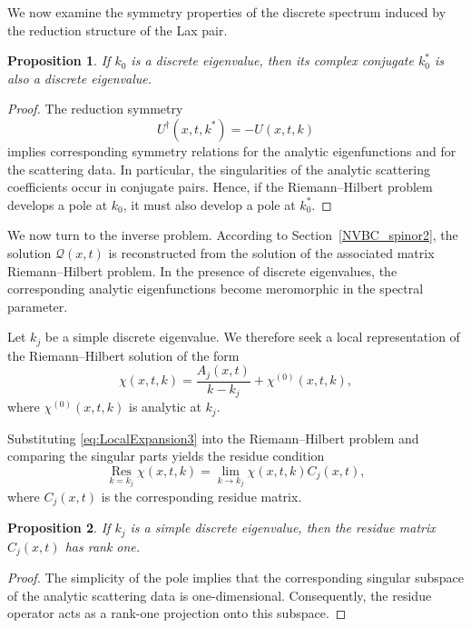\documentclass[11pt]{amsart}
\newtheorem{proposition}{Proposition}[section]
\theoremstyle{definition}
\numberwithin{equation}{section}
\begin{document}
We now examine the symmetry properties of the discrete spectrum induced by the reduction structure of the Lax pair.

\begin{proposition}
If $k_0$ is a discrete eigenvalue, then its complex conjugate $k_0^*$ is also a discrete eigenvalue.
\end{proposition}

\begin{proof}
The reduction symmetry
\begin{equation}
U^\dagger(x,t,k^*)=-U(x,t,k)
\label{eq:ReductionSymmetry3}
\end{equation}
implies corresponding symmetry relations for the analytic eigenfunctions and for the scattering data. In particular, the singularities of the analytic scattering coefficients occur in conjugate pairs. Hence, if the Riemann--Hilbert problem develops a pole at $k_0$, it must also develop a pole at $k_0^*$.
\end{proof}

We now turn to the inverse problem. According to Section~\ref{NVBC_spinor2}, the solution $\mathcal Q(x,t)$ is reconstructed from the solution of the associated matrix Riemann--Hilbert problem. In the presence of discrete eigenvalues, the corresponding analytic eigenfunctions become meromorphic in the spectral parameter.

Let $k_j$ be a simple discrete eigenvalue. We therefore seek a local representation of the Riemann--Hilbert solution of the form
\begin{equation}
\chi(x,t,k)
=
\frac{A_j(x,t)}{k-k_j}
+
\chi^{(0)}(x,t,k),
\label{eq:LocalExpansion3}
\end{equation}
where $\chi^{(0)}(x,t,k)$ is analytic at $k_j$.

Substituting \eqref{eq:LocalExpansion3} into the Riemann--Hilbert problem and comparing the singular parts yields the residue condition
\begin{equation}
\operatorname*{Res}_{k=k_j}\chi(x,t,k)
=
\lim_{k\to k_j}
\chi(x,t,k)C_j(x,t),
\label{eq:ResidueCondition3}
\end{equation}
where $C_j(x,t)$ is the corresponding residue matrix.

\begin{proposition}
If $k_j$ is a simple discrete eigenvalue, then the residue matrix $C_j(x,t)$ has rank one.
\end{proposition}

\begin{proof}
The simplicity of the pole implies that the corresponding singular subspace of the analytic scattering data is one-dimensional. Consequently, the residue operator acts as a rank-one projection onto this subspace.
\end{proof}
\end{document}
